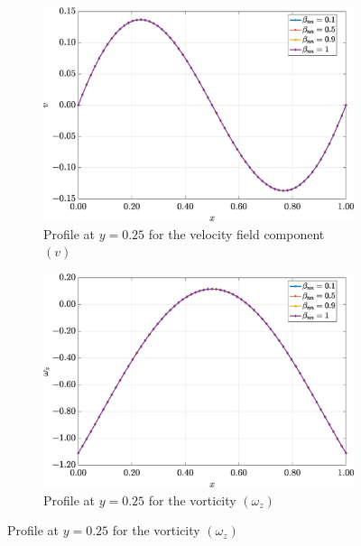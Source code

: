 \documentclass[preprint, 12pt]{elsarticle}
\begin{document}
\begin{figure}[H]
\begin{subfigure}[b]{.46\textwidth}
        \includegraphics[width=\textwidth]{Slice_y_Tog_Numerical_NormErr_2nd_Betann_1_Re_1000_Wi_1_epsilon_0_xi_0_alphaG_0.5_Dt_1e-06_at_0.05_tipsim_1_MMS_12_x0.25y0.25_V.eps}
        \caption{Profile at $y=0.25$ for the velocity field component $(v)$}
        \label{fig_slice_y_v_2nd_Case1_giesekus_y025}
    \end{subfigure}
    \begin{subfigure}[b]{.46\textwidth}
        \includegraphics[width=\textwidth]{Slice_y_Tog_Numerical_NormErr_2nd_Betann_1_Re_1000_Wi_1_epsilon_0_xi_0_alphaG_0.5_Dt_1e-06_at_0.05_tipsim_1_MMS_12_x0.25y0.25_Wz.eps}
        \caption{Profile at $y=0.25$ for the vorticity $(\omega_{z})$}
        \label{fig_slice_y_wz_2nd_Case1_giesekus_y025}
    \end{subfigure}
    \vspace{0.2cm}
    \qquad

\end{figure}
\end{document}
